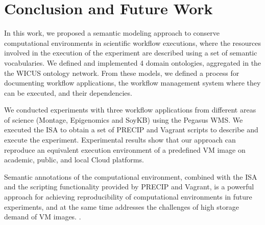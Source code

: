 \section{Conclusion and Future Work}
\label{sec:conclusion}



In this work, we proposed a semantic modeling approach to conserve computational environments in scientific workflow executions, where  the resources involved in the execution of the experiment are described using a set of semantic vocabularies. We defined and implemented 4 domain ontologies, aggregated in the the WICUS ontology network. From these models, we defined a process for documenting workflow applications, the workflow management system where they can be executed, and their dependencies. 

We conducted experiments with three workflow applications from different areas of science (Montage, Epigenomics and SoyKB) using the Pegasus WMS. We executed the ISA to obtain a set of PRECIP and Vagrant scripts to describe and execute the experiment. Experimental results show that our approach can reproduce an equivalent execution environment of a predefined VM image on academic, public, and local Cloud platforms.

Semantic annotations of the computational environment, combined with the ISA and the scripting functionality provided by PRECIP and Vagrant, is a powerful approach for achieving reproducibility of computational environments in future experiments, and at the same time addresses the challenges of high storage demand of VM images. . 

